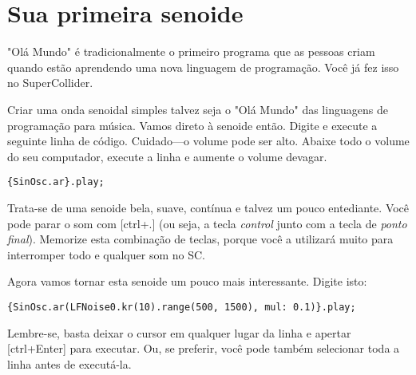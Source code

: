 \section{Sua primeira senoide \label{sec:first-sine}}


"Olá Mundo" é tradicionalmente o primeiro programa que as pessoas criam quando estão aprendendo uma nova linguagem de programação. Você já fez isso no SuperCollider.

Criar uma onda senoidal simples talvez seja o "Olá Mundo" das linguagens de programação para música. Vamos direto à senoide então. Digite e execute a seguinte linha de código. Cuidado---o volume pode ser alto. Abaixe todo o volume do seu computador, execute a linha e aumente o volume devagar.
 
\begin{lstlisting}[style=SuperCollider-IDE, basicstyle=\scttfamily\footnotesize]
{SinOsc.ar}.play;
\end{lstlisting}
 

Trata-se de uma senoide bela, suave, contínua e talvez um pouco entediante. Você pode parar o som com [ctrl+.] (ou seja, a tecla \emph{control} junto com a tecla de \emph{ponto final}). Memorize esta combinação de teclas, porque você a utilizará muito para interromper todo e qualquer som no SC.

\bigskip
{}
\bigskip

Agora vamos tornar esta senoide um pouco mais interessante. Digite isto:

 
\begin{lstlisting}[style=SuperCollider-IDE, basicstyle=\scttfamily\footnotesize ]
{SinOsc.ar(LFNoise0.kr(10).range(500, 1500), mul: 0.1)}.play;
\end{lstlisting}
 

Lembre-se, basta deixar o cursor em qualquer lugar da linha e apertar [ctrl+Enter] para executar. Ou, se preferir, você pode também selecionar toda a linha antes de executá-la.

 
\bigskip
{}
